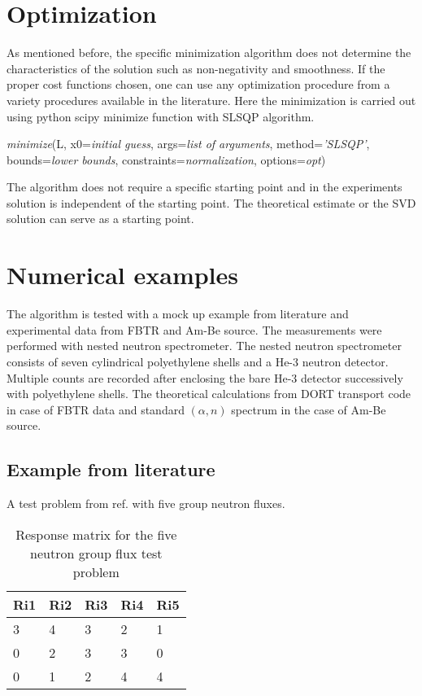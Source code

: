 \documentclass[review]{elsarticle}
\begin{document}
 
 \section{Optimization}
 
 As mentioned before, the specific minimization algorithm does not determine the characteristics of the solution such as non-negativity and smoothness. If the proper cost functions chosen, one can use any optimization procedure from a variety procedures available in the literature. 
 Here the minimization is carried out using python scipy  minimize function with SLSQP algorithm\cite{slsqp}.
 
 \textit{minimize}(L, x0=\textit{initial guess}, args=\textit{list of arguments}, method=\textit{'SLSQP'}, bounds=\textit{lower bounds}, constraints=\textit{normalization}, options=\textit{opt})

 
 The algorithm does not require a specific starting point and in the experiments solution is independent of the starting point. The theoretical estimate or the SVD solution can serve as a starting point.

\section{Numerical examples}

The algorithm is tested with a mock up example from literature\cite{Iguchi} and experimental data from FBTR and Am-Be source. The measurements were performed with nested neutron spectrometer. The nested neutron spectrometer consists of  seven cylindrical polyethylene shells and a He-3 neutron detector.  Multiple counts are recorded after enclosing the bare He-3 detector successively with polyethylene shells.  The theoretical calculations from DORT transport code in case of FBTR data and standard $(\alpha, n)$ spectrum in the case of Am-Be source.   

\subsection{Example from  literature}

A test problem from ref.\cite{Iguchi} with five group neutron fluxes.

\begin{table}[h!]
	\centering
	\caption{Response matrix for the five neutron group flux test problem\cite{Iguchi}}
	\label{tab:ex1-resp}
	\begin{tabular}{||l|l|l|l|l||}
		\hline
		Ri1&Ri2&Ri3&Ri4&Ri5\\ \hline
		3&4&3&2&1 \\ \hline
		0&2&3&3&0 \\ \hline
		0&1&2&4&4 \\ \hline
	\end{tabular}
\end{table}	
\end{document}
